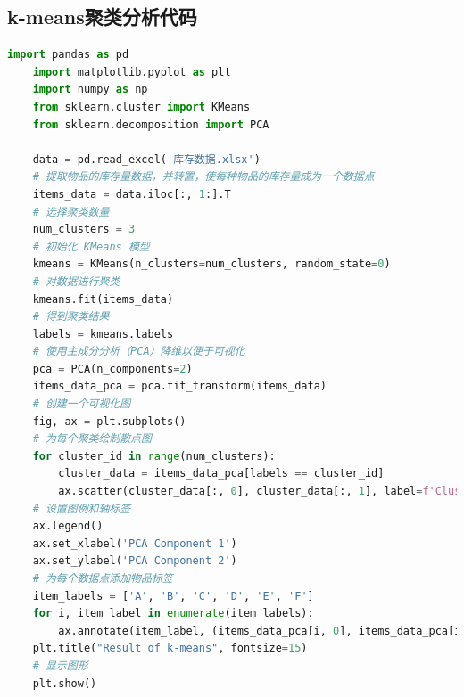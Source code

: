 \documentclass[12pt,a4paper]{article}
\begin{document}
\subsection{k-means聚类分析代码}
\begin{lstlisting}[language={python}]
    import pandas as pd
    import matplotlib.pyplot as plt
    import numpy as np
    from sklearn.cluster import KMeans
    from sklearn.decomposition import PCA

    data = pd.read_excel('库存数据.xlsx')
    # 提取物品的库存量数据，并转置，使每种物品的库存量成为一个数据点
    items_data = data.iloc[:, 1:].T
    # 选择聚类数量
    num_clusters = 3
    # 初始化 KMeans 模型
    kmeans = KMeans(n_clusters=num_clusters, random_state=0)
    # 对数据进行聚类
    kmeans.fit(items_data)
    # 得到聚类结果
    labels = kmeans.labels_
    # 使用主成分分析（PCA）降维以便于可视化
    pca = PCA(n_components=2)
    items_data_pca = pca.fit_transform(items_data)
    # 创建一个可视化图
    fig, ax = plt.subplots()
    # 为每个聚类绘制散点图
    for cluster_id in range(num_clusters):
        cluster_data = items_data_pca[labels == cluster_id]
        ax.scatter(cluster_data[:, 0], cluster_data[:, 1], label=f'Cluster {cluster_id}', s=120)
    # 设置图例和轴标签
    ax.legend()
    ax.set_xlabel('PCA Component 1')
    ax.set_ylabel('PCA Component 2')
    # 为每个数据点添加物品标签
    item_labels = ['A', 'B', 'C', 'D', 'E', 'F']
    for i, item_label in enumerate(item_labels):
        ax.annotate(item_label, (items_data_pca[i, 0], items_data_pca[i, 1]))
    plt.title("Result of k-means", fontsize=15)
    # 显示图形
    plt.show()
\end{lstlisting}
\end{document}
